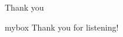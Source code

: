 \documentclass[xetex,10pt,aspectratio=43]{beamer}
\begin{document}
\begin{frame}{Thank you}
\begin{center}
\begin{minipage}{1\textwidth}
 \begin{beamercolorbox}[wd=0.70\textwidth, rounded=true, shadow=true]{mybox}
\LARGE \centering Thank you for listening!  %
\end{beamercolorbox}
 \end{minipage}
\end{center}
\end{frame}


\end{document}
